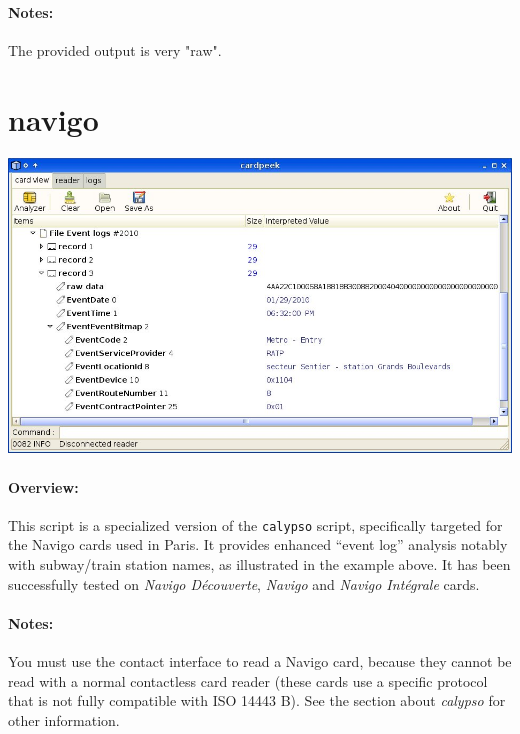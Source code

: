 \documentclass[11pt]{report}
\begin{document}
\paragraph{Notes:}
The provided output is very "raw".

\section{navigo}

\begin{center}
\includegraphics[width=1\textwidth]{graphics/sample-navigo.jpg}
\end{center}

\paragraph{Overview:}
This script is a specialized version of the \texttt{calypso} script, specifically targeted for the Navigo cards used in Paris.
It provides enhanced ``event log'' analysis notably with subway/train station names, as illustrated in the example above.
It has been successfully tested on \emph{Navigo D\'ecouverte}, \emph{Navigo} and \emph{Navigo Int\'egrale} cards.

\paragraph{Notes:}
You must use the contact interface to read a Navigo card, because they cannot be read with a normal contactless 
card reader (these cards use a specific protocol that is not fully compatible with ISO 14443 B).
See the section about \emph{calypso} for other information.

\end{document}
